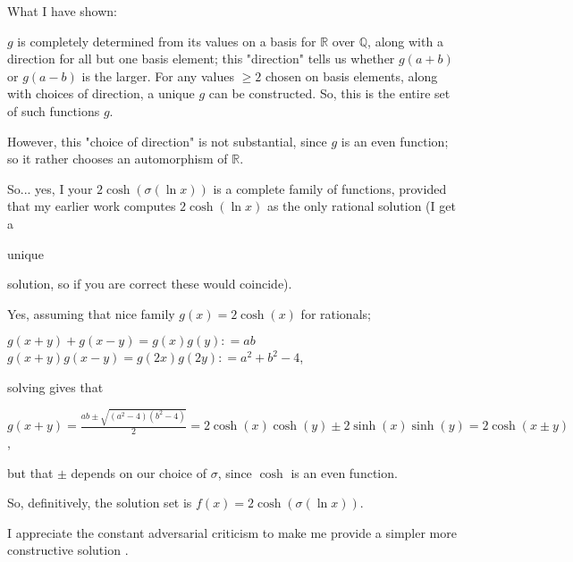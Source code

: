 \begin{solution}
	What I have shown: 

$ g$ is completely determined from its values on a basis for $ \mathbb{R}$ over $ \mathbb{Q}$, along with 
a direction for all but one basis element; this "direction" tells us whether $ g(a + b)$ or $ g(a - b)$ is the larger.
For any values $ \ge 2$ chosen on basis elements, along with choices of direction, a unique $ g$ can be 
constructed. So, this is the entire set of such functions $ g$.

However, this "choice of direction" is not substantial, since $ g$ is an even function; so it rather chooses
an automorphism of $ \mathbb{R}$.

So... yes, I your $ 2\cosh(\sigma(\ln x))$ is a complete family of functions, provided that my earlier
work computes $ 2 \cosh (\ln x)$ as the only rational solution (I get a \begin{italicized} unique \end{italicized} solution, so
if you are correct these would coincide).
\end{solution}



\begin{solution}
	Yes, assuming that nice family $ g(x) = 2\cosh (x)$ for rationals;

$ g(x+y) + g(x-y) = g(x)g(y) : = ab$
$ g(x+y)g(x-y) = g(2x)g(2y) : = a^2 + b^2 -4$,

solving gives that 

$ g(x+y) = \frac{ab \pm \sqrt{(a^2-4)(b^2-4)}}{2} = 2\cosh(x)\cosh(y) \pm 2\sinh(x)\sinh(y) = 2 \cosh(x \pm y)$,

but that $ \pm$ depends on our choice of $ \sigma$, since $ \cosh$ is an even function.

So, definitively, the solution set is $ f(x) = 2\cosh(\sigma(\ln x))$.

I appreciate the constant adversarial criticism to make me provide a simpler more constructive solution  .
\end{solution}



